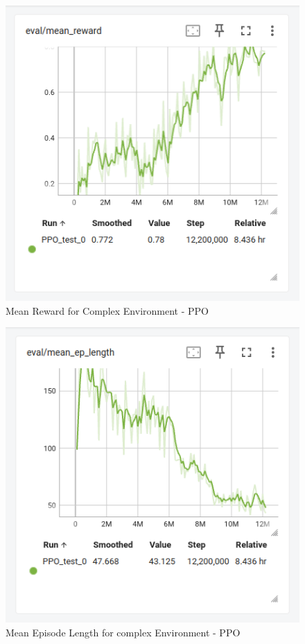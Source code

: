 \documentclass[conference]{IEEEtran}
\begin{document}
\begin{itemize}
\begin{figure}[!htb]
\centering
\includegraphics[width=0.8\columnwidth,keepaspectratio]{RL_project_update/mean_reward.png}
\caption{Mean Reward for Complex Environment  - PPO}
\label{fig:your_label}
\end{figure}


\begin{figure}[!htb]
\centering
\includegraphics[width=0.8\columnwidth,keepaspectratio]{RL_project_update/man_ep_length.png}
\caption{Mean Episode Length for complex Environment - PPO}
\label{fig:your_label}
\end{figure}


\end{itemize}
\end{document}
